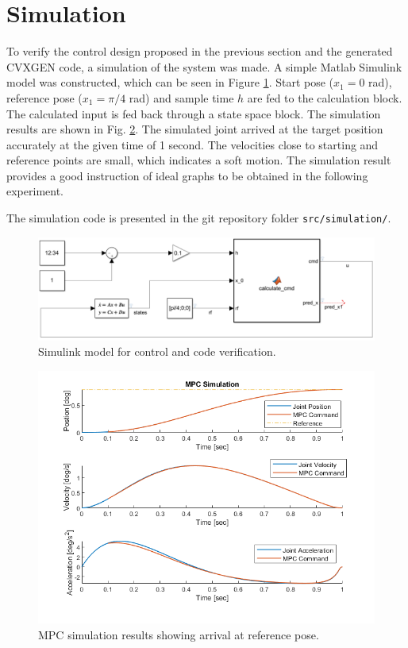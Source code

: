 \documentclass[final]{LTHtwocol} %
\begin{document}
\section{Simulation}\label{sec:simulation}
To verify the control design proposed in the previous section and the generated CVXGEN code, a simulation of the system was made. A simple Matlab Simulink model was constructed, which can be seen in Figure \ref{fig:sim_model}. Start pose ($x_1=0$ rad), reference pose ($x_1=\pi/4$ rad) and sample time $h$ are fed to the calculation block. The calculated input is fed back through a state space block. The simulation results are shown in Fig. \ref{fig:sim_result}. The simulated joint arrived at the target position accurately at the given time of 1 second. The velocities close to starting and reference points are small, which indicates a soft motion. The simulation result provides a good instruction of ideal graphs to be obtained in the following experiment.   

The simulation code is presented in the git repository folder \texttt{src/simulation/}.\cite{gitrepo} 

\begin{figure}
    \centering
    \includegraphics[width=\linewidth]{simulink_model.png}
    \caption{Simulink model for control and code verification.}
    \label{fig:sim_model}
\end{figure}

\begin{figure}
    \centering
    \includegraphics[width=\linewidth]{simfig.png}
    \caption{MPC simulation results showing arrival at reference pose.}
    \label{fig:sim_result}
\end{figure}
\end{document}

